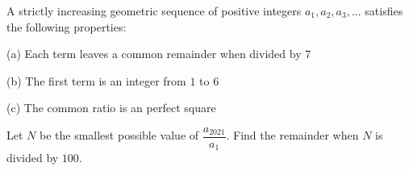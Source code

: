 A strictly increasing geometric sequence of positive integers $a_1, a_2, a_3,...$ satisfies the following properties:

(a) Each term leaves a common remainder when divided by $7$

(b) The first term is an integer from $1$ to $6$

(c) The common ratio is an perfect square

Let $N$ be the smallest possible value of $\dfrac{a_{2021}}{a_1}$. Find the remainder when $N$ is divided by $100$.
